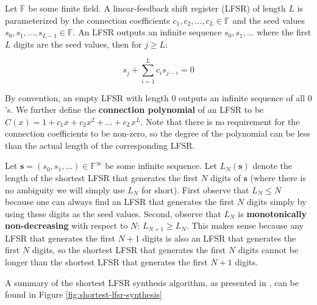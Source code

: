 \documentclass[runningheads]{llncs}
\begin{document}
Let $\mathbb{F}$ be some finite field. A linear-feedback shift register (LFSR) of length $L$ is parameterized by the connection coefficients $c_1, c_2, \ldots, c_L \in \mathbb{F}$ and the seed values $s_0, s_1, \ldots, s_{L-1}\in\mathbb{F}$. An LFSR outputs an infinite sequence $s_0, s_1, \ldots$ where the first $L$ digits are the seed values, then for $j \geq L$:

\begin{equation*}
    s_j + \sum_{i=1}^{L}c_is_{j-i} = 0
\end{equation*}

By convention, an empty LFSR with length $0$ outputs an infinite sequence of all $0$'s. We further define the \textbf{connection polynomial} of an LFSR to be $C(x) = 1 + c_1x + c_2x^2 + \ldots + c_Lx^L$. Note that there is no requirement for the connection coefficients to be non-zero, so the degree of the polynomial can be less than the actual length of the corresponding LFSR.

Let $\mathbf{s} = (s_0, s_1, \ldots) \in \mathbb{F}^\infty$ be some infinite sequence. Let $L_N(\mathbf{s})$ denote the length of the shortest LFSR that generates the first $N$ digits of $\mathbf{s}$ (where there is no ambiguity we will simply use $L_N$ for short). First observe that $L_N \leq N$ because one can always find an LFSR that generates the first $N$ digits simply by using these digits as the seed values. Second, observe that $L_N$ is \textbf{monotonically non-decreasing} with respect to $N$: $L_{N+1}\geq L_N$. This makes sense because any LFSR that generates the first $N+1$ digits is also an LFSR that generates the first $N$ digits, so the shortest LFSR that generates the first $N$ digits cannot be longer than the shortest LFSR that generates the first $N + 1$ digits.

A summary of the shortest LFSR synthesis algorithm, as presented in \cite{DBLP:journals/tit/Massey69}, can be found in Figure \ref{fig:shortest-lfsr-synthesis}
\end{document}

